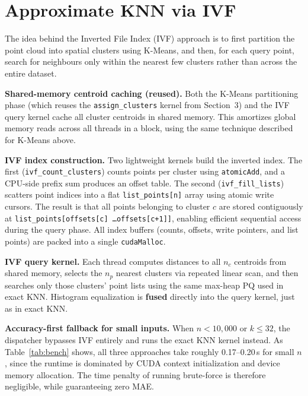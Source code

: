 \documentclass[11pt,a4paper]{article}
\begin{document}
\section{Approximate KNN via IVF}

The idea behind the Inverted File Index (IVF) approach is to first partition the point cloud into spatial clusters using K-Means, and then, for each query point, search for neighbours only within the nearest few clusters rather than across the entire dataset.

\textbf{Shared-memory centroid caching (reused).}
Both the K-Means partitioning phase (which reuses the \texttt{assign\_clusters} kernel from Section~3) and the IVF query kernel cache all cluster centroids in shared memory.
This amortizes global memory reads across all threads in a block, using the same technique described for K-Means above.

\textbf{IVF index construction.}
Two lightweight kernels build the inverted index.
The first (\texttt{ivf\_count\_clusters}) counts points per cluster using \texttt{atomicAdd}, and a CPU-side prefix sum produces an offset table.
The second (\texttt{ivf\_fill\_lists}) scatters point indices into a flat \texttt{list\_points[n]} array using atomic write cursors.
The result is that all points belonging to cluster $c$ are stored contiguously at \texttt{list\_points[offsets[c] \ldots offsets[c+1]]}, enabling efficient sequential access during the query phase.
All index buffers (counts, offsets, write pointers, and list points) are packed into a single \texttt{cudaMalloc}.

\textbf{IVF query kernel.}
Each thread computes distances to all $n_c$ centroids from shared memory, selects the $n_p$ nearest clusters via repeated linear scan, and then searches only those clusters' point lists using the same max-heap PQ used in exact KNN.
Histogram equalization is \textbf{fused} directly into the query kernel, just as in exact KNN.

\textbf{Accuracy-first fallback for small inputs.}
When $n < 10{,}000$ or $k \leq 32$, the dispatcher bypasses IVF entirely and runs the exact KNN kernel instead.
As Table~\ref{tab:bench} shows, all three approaches take roughly 0.17--0.20\,s for small $n$, since the runtime is dominated by CUDA context initialization and device memory allocation.
The time penalty of running brute-force is therefore negligible, while guaranteeing zero MAE.
\end{document}
